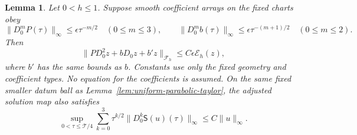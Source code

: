 \documentclass[11pt]{article}
\numberwithin{equation}{section}
\newtheorem{lemma}[theorem]{Lemma}
\theoremstyle{definition}
\theoremstyle{remark}
\begin{document}
\begin{lemma}\label{lem:mixed-endpoint-products}
Let \(0<h\le1\). Suppose smooth coefficient arrays on
the fixed charts obey
\[
 \|D_0^mP(\tau)\|_\infty\le\epsilon\tau^{-m/2}
       \quad(0\le m\le3),\qquad
 \|D_0^mb(\tau)\|_\infty\le\epsilon\tau^{-(m+1)/2}
       \quad(0\le m\le2).
\]
Then
\[
 \|P D_0^2z+bD_0z+b'z\|_{\mathcal F_h}
                  \le C\epsilon\mathcal E_h(z),
\]
where \(b'\) has the same bounds as \(b\).
Constants use only the fixed geometry and coefficient
types. No equation for the coefficients is assumed.
On the same fixed smaller datum ball as
Lemma~\ref{lem:uniform-parabolic-taylor}, the adjusted
solution map also satisfies
\begin{equation}\label{eq:endpoint-third-jet}
 \sup_{0<\tau\le\mathcal T/4}
   \sum_{k=0}^3\tau^{k/2}\|D_0^k\mathsf S(u)(\tau)\|_\infty
       \le C\|u\|_\infty .
\end{equation}
\end{lemma}
\end{document}
